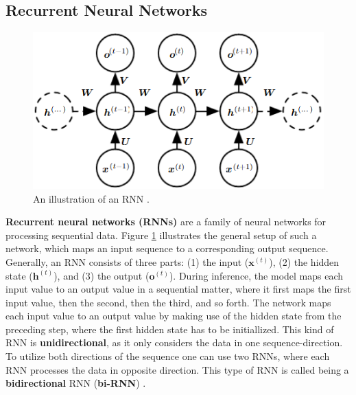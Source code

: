 \documentclass[./main.tex]{subfiles}
\begin{document}
\subsection{Recurrent Neural Networks}
\label{sec:RNN}
\begin{figure}[htbp]
    \centering
    \includegraphics[width = 0.5 \textwidth]{./entities/rnn_illustration.PNG}
    \caption{An illustration of an RNN \cite{DL_book}.}
    \label{fig:rnn_illustration}
\end{figure}
\noindent \textbf{Recurrent neural networks (RNNs)} are a family of neural networks for processing sequential data. Figure \ref{fig:rnn_illustration} illustrates the general setup of such a network, which maps an input sequence to a corresponding output sequence. Generally, an RNN consists of three parts: (1) the input ($\bm{x}^{(t)}$), (2) the hidden state ($\bm{h}^{(t)}$), and (3) the output ($\bm{o}^{(t)}$). During inference, the model maps each input value to an output value in a sequential matter, where it first maps the first input value, then the second, then the third, and so forth. The network maps each input value to an output value by making use of the hidden state from the preceding step, where the first hidden state has to be initiallized. This kind of RNN is \textbf{unidirectional}, as it only considers the data in one sequence-direction. To utilize both directions of the sequence one can use two RNNs, where each RNN processes the data in opposite direction. This type of RNN is called being a \textbf{bidirectional} RNN (\textbf{bi-RNN}) \cite{DL_book}.
\end{document}
